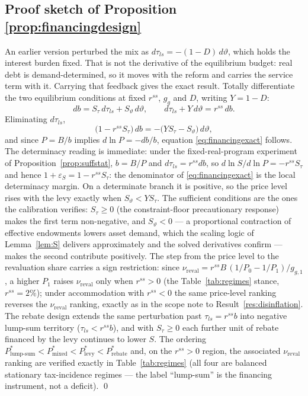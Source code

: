 \documentclass[12pt]{article}
\newcommand{\Sfun}{S}
\begin{document}
\subsection{Proof sketch of Proposition \ref{prop:financingdesign}}
An earlier version perturbed the mix as
$d\tau_{ls}=-(1-D)\,d\vartheta$, which holds the interest burden fixed. That
is not the derivative of the equilibrium budget: real debt is
demand-determined, so it moves with the reform and carries the service
term with it. Carrying that feedback gives the exact result. Totally
differentiate the two equilibrium conditions at fixed $r^{ss}$, $g_g$ and
$D$, writing $Y=1-D$:
\[
db=\Sfun_\tau\,d\tau_{ls}+\Sfun_\vartheta\,d\vartheta,
\qquad
d\tau_{ls}+Y\,d\vartheta=r^{ss}\,db .
\]
Eliminating $d\tau_{ls}$,
\[
\bigl(1-r^{ss}\Sfun_\tau\bigr)\,db
=-\bigl(Y\Sfun_\tau-\Sfun_\vartheta\bigr)\,d\vartheta ,
\]
and since $P=B/b$ implies $d\ln P=-db/b$, equation
\eqref{eq:financingexact} follows. The determinacy reading is immediate:
under the fixed-real-program experiment of
Proposition~\ref{prop:suffstat}, $b=B/P$ and $d\tau_{ls}=r^{ss}db$, so
$d\ln\Sfun/d\ln P=-r^{ss}\Sfun_\tau$ and hence
$1+\varepsilon_\Sfun=1-r^{ss}\Sfun_\tau$: the denominator of
\eqref{eq:financingexact} is the local determinacy margin. On a determinate
branch it is positive, so the price level rises with the levy exactly when
$\Sfun_\vartheta<Y\Sfun_\tau$. The sufficient conditions are the ones the
calibration verifies: $\Sfun_\tau\ge0$ (the constraint-floor precautionary
response) makes the first term non-negative, and $\Sfun_\vartheta<0$ --- a
proportional contraction of effective endowments lowers asset demand, which
the scaling logic of Lemma~\ref{lem:S} delivers approximately and the
solved derivatives confirm --- makes the second contribute positively. The step from the price level to the
revaluation share carries a sign restriction: since
$\nu_{\mathrm{reval}} = r^{ss}B\,(1/P_0 - 1/P_1)/g_{g,1}$, a higher $P_1$
raises $\nu_{\mathrm{reval}}$ only when $r^{ss}>0$ (the Table~\ref{tab:regimes}
stance, $r^{ss}=2\%$); under accommodation with $r^{ss}<0$ the same
price-level ranking reverses the $\nu_{\mathrm{reval}}$ ranking, exactly as
in the scope note to Result~\ref{res:disinflation}. The rebate
design extends the same perturbation past $\tau_{ls} = r^{ss}b$ into
negative lump-sum territory ($\tau_{ls} < r^{ss}b$), and with
$\Sfun_{\tau} \ge 0$ each further unit of rebate financed by the levy
continues to lower $\Sfun$. The ordering
$P^{*}_{\text{lump-sum}} < P^{*}_{\text{mixed}} < P^{*}_{\text{levy}} <
P^{*}_{\text{rebate}}$ and, on the $r^{ss}>0$ region, the associated $\nu_{\mathrm{reval}}$ ranking are
verified exactly in Table~\ref{tab:regimes} (all four are balanced stationary
tax-incidence regimes --- the label ``lump-sum'' is the financing instrument,
not a deficit). \qed
\end{document}

